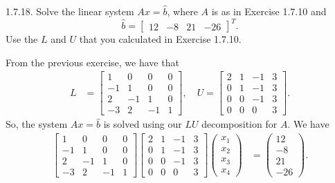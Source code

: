 \documentclass{report}
\begin{document}
    \bigbreak \noindent 
    \begin{mdframed}
        1.7.18. Solve the linear system $A x = \hat{b}$, where $A$ is as in Exercise 1.7.10 and 
        \[
            \hat{b} = \begin{bmatrix} 12 & -8 & 21 & -26 \end{bmatrix}^{T}.
        \]
        Use the $L$ and $U$ that you calculated in Exercise 1.7.10.
    \end{mdframed}
    \bigbreak \noindent 
    From the previous exercise, we have that
    \begin{align*}
        L &= \begin{bmatrix} 1 & 0& 0 & 0 \\ -1 & 1 & 0& 0 \\ 2 & -1 & 1 & 0\\ -3 & 2 & -1 & 1 \end{bmatrix}, 
        \quad U = \begin{bmatrix} 2 & 1 & -1 & 3  \\ 0 & 1 & -1 & 3 \\ 0 & 0 & -1 & 3\\ 0 & 0 & 0 & 3 \end{bmatrix}
    .\end{align*}
    So, the system $Ax = \hat{b}$ is solved using our $LU$ decomposition for $A$. We have
    \begin{align*}
        \begin{bmatrix} 1 & 0& 0 & 0 \\ -1 & 1 & 0& 0 \\ 2 & -1 & 1 & 0\\ -3 & 2 & -1 & 1 \end{bmatrix} \begin{bmatrix} 2 & 1 & -1 & 3  \\ 0 & 1 & -1 & 3 \\ 0 & 0 & -1 & 3\\ 0 & 0 & 0 & 3 \end{bmatrix} \begin{pmatrix} x_{1} \\ x_{2} \\ x_{3} \\ x_{4} \end{pmatrix} &= \begin{pmatrix} 12 \\ -8 \\ 21 \\ -26 \end{pmatrix}
    .\end{align*}
\end{document}
